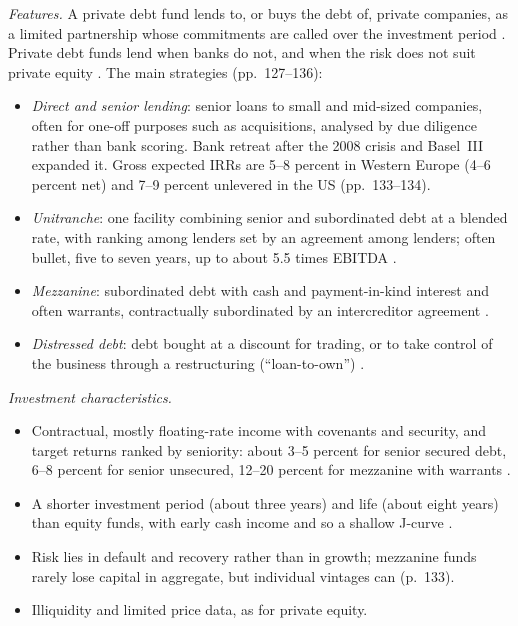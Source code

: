 \begin{qfdefinition}\label{def:private-debt-features}
 \emph{Features.} A private debt fund lends to, or buys the debt of, private companies, as a limited partnership whose commitments are called over the investment period \citep[p.~13]{ippolito-private-capital-2020}. Private debt funds lend when banks do not, and when the risk does not suit private equity \citep[p.~127]{demaria-private-markets-2021}. The main strategies (pp.~127--136):
\begin{itemize}
\item \emph{Direct and senior lending}: senior loans to small and mid-sized companies, often for one-off purposes such as acquisitions, analysed by due diligence rather than bank scoring. Bank retreat after the 2008 crisis and Basel~III expanded it. Gross expected IRRs are 5--8 percent in Western Europe (4--6 percent net) and 7--9 percent unlevered in the US (pp.~133--134).
\item \emph{Unitranche}: one facility combining senior and subordinated debt at a blended rate, with ranking among lenders set by an agreement among lenders; often bullet, five to seven years, up to about 5.5 times EBITDA \citep[pp.~43--44]{ippolito-private-capital-2020}.
\item \emph{Mezzanine}: subordinated debt with cash and payment-in-kind interest and often warrants, contractually subordinated by an intercreditor agreement \citep[pp.~39--42]{ippolito-private-capital-2020}.
\item \emph{Distressed debt}: debt bought at a discount for trading, or to take control of the business through a restructuring (``loan-to-own'') \citep[pp.~127--128]{demaria-private-markets-2021}.
\end{itemize}

\emph{Investment characteristics.}
\begin{itemize}
\item Contractual, mostly floating-rate income with covenants and security, and target returns ranked by seniority: about 3--5 percent for senior secured debt, 6--8 percent for senior unsecured, 12--20 percent for mezzanine with warrants \citep[p.~21, Table~1.3]{ippolito-private-capital-2020}.
\item A shorter investment period (about three years) and life (about eight years) than equity funds, with early cash income and so a shallow J-curve \citep[pp.~61--62]{demaria-private-markets-2021}.
\item Risk lies in default and recovery rather than in growth; mezzanine funds rarely lose capital in aggregate, but individual vintages can (p.~133).
\item Illiquidity and limited price data, as for private equity.
\end{itemize}


\end{qfdefinition}

